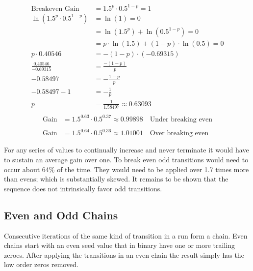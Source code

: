 \documentclass[letterpaper]{article}
\begin{document}
\begin{multicols}{2}
    \begin{align*}
        \text{Breakeven Gain}                   & = 1.5^p \cdot 0.5^{1-p} = 1                   \\
        \ln\left( 1.5^p \cdot 0.5^{1-p} \right) & = \ln(1) = 0                                  \\
                                                & = \ln(1.5^p) + \ln(0.5^{1-p}) = 0             \\
                                                & = p \cdot \ln(1.5) + (1-p) \cdot \ln(0.5) = 0 \\
        p \cdot 0.40546                         & = -(1-p) \cdot (-0.69315)                     \\
        \frac{0.40546}{-0.69315}                & = \frac{-(1-p)}{p}                            \\
        -0.58497                                & = -\frac{1-p}{p}                              \\
        -0.58497 - 1                            & = -\frac{1}{p}                                \\
        p                                       & = \frac{1}{1.58497} \approx 0.63093           \\
    \end{align*}
    \begin{align*}
        \text{Gain} & = 1.5^{0.63} \cdot 0.5^{0.37} \approx 0.99898 \quad \text{Under breaking even} \\
        \\
        \text{Gain} & = 1.5^{0.64} \cdot 0.5^{0.36} \approx 1.01001 \quad \text{Over breaking even}
    \end{align*}

    For any series of values to continually increase and never terminate it would have to sustain an average gain over one. To break even odd transitions would need to occur about 64\% of the time. They would need to be applied over 1.7 times more than evens; which is substantially skewed. It remains to be shown that the sequence does not intrinsically favor odd transitions.

    \subsection{Even and Odd Chains}

    Consecutive iterations of the same kind of transition in a run form a chain. Even chains start with an even seed value that in binary have one or more trailing zeroes. After applying the transitions in an even chain the result simply has the low order zeros removed.


\end{multicols}
\end{document}
